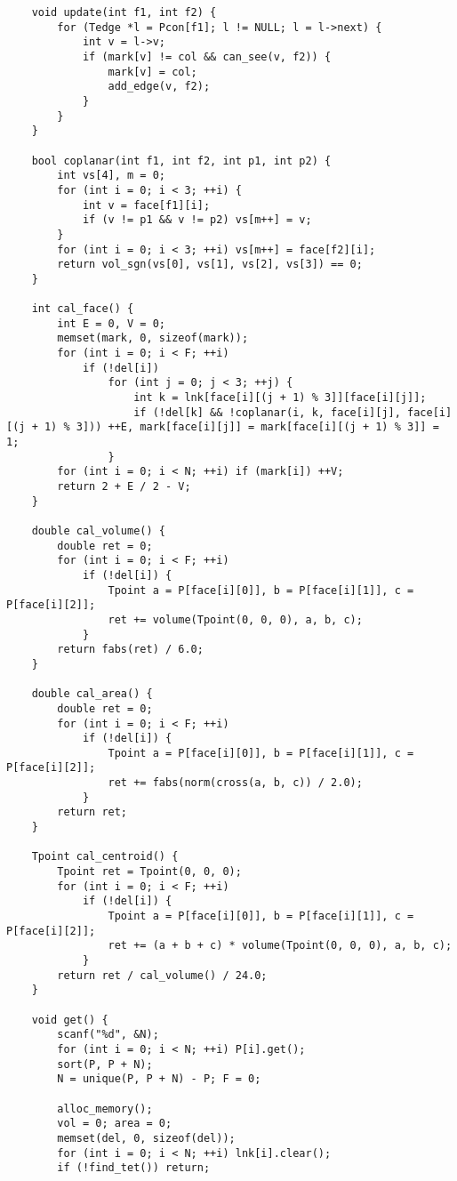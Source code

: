 \begin{verbatim}
    void update(int f1, int f2) {
        for (Tedge *l = Pcon[f1]; l != NULL; l = l->next) {
            int v = l->v;
            if (mark[v] != col && can_see(v, f2)) {
                mark[v] = col;
                add_edge(v, f2);
            }
        }
    }

    bool coplanar(int f1, int f2, int p1, int p2) {
        int vs[4], m = 0;
        for (int i = 0; i < 3; ++i) {
            int v = face[f1][i];
            if (v != p1 && v != p2) vs[m++] = v;
        }
        for (int i = 0; i < 3; ++i) vs[m++] = face[f2][i];
        return vol_sgn(vs[0], vs[1], vs[2], vs[3]) == 0;
    }

    int cal_face() {
        int E = 0, V = 0;
        memset(mark, 0, sizeof(mark));
        for (int i = 0; i < F; ++i)
            if (!del[i])
                for (int j = 0; j < 3; ++j) {
                    int k = lnk[face[i][(j + 1) % 3]][face[i][j]];
                    if (!del[k] && !coplanar(i, k, face[i][j], face[i][(j + 1) % 3])) ++E, mark[face[i][j]] = mark[face[i][(j + 1) % 3]] = 1;
                }
        for (int i = 0; i < N; ++i) if (mark[i]) ++V;
        return 2 + E / 2 - V;
    }

    double cal_volume() {
        double ret = 0;
        for (int i = 0; i < F; ++i)
            if (!del[i]) {
                Tpoint a = P[face[i][0]], b = P[face[i][1]], c = P[face[i][2]];
                ret += volume(Tpoint(0, 0, 0), a, b, c);
            }
        return fabs(ret) / 6.0;
    }

    double cal_area() {
        double ret = 0;
        for (int i = 0; i < F; ++i)
            if (!del[i]) {
                Tpoint a = P[face[i][0]], b = P[face[i][1]], c = P[face[i][2]];
                ret += fabs(norm(cross(a, b, c)) / 2.0);
            }
        return ret;
    }

    Tpoint cal_centroid() {
        Tpoint ret = Tpoint(0, 0, 0);
        for (int i = 0; i < F; ++i)
            if (!del[i]) {
                Tpoint a = P[face[i][0]], b = P[face[i][1]], c = P[face[i][2]];
                ret += (a + b + c) * volume(Tpoint(0, 0, 0), a, b, c);
            }
        return ret / cal_volume() / 24.0;
    }

    void get() {
        scanf("%d", &N);
        for (int i = 0; i < N; ++i) P[i].get();
        sort(P, P + N);
        N = unique(P, P + N) - P; F = 0;    

        alloc_memory();
        vol = 0; area = 0;
        memset(del, 0, sizeof(del));
        for (int i = 0; i < N; ++i) lnk[i].clear();
        if (!find_tet()) return;


\end{verbatim}
